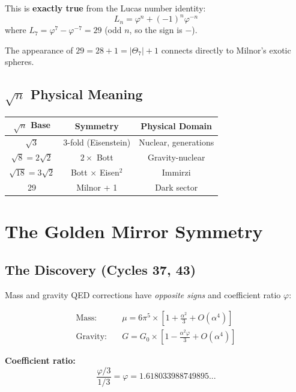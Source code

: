 \documentclass[aps,prd,twocolumn,superscriptaddress,floatfix,nofootinbib]{revtex4-2}
\theoremstyle{definition}
\theoremstyle{remark}
\newcommand{\vp}{\varphi}
\newcommand{\Th}{\Theta}
\begin{document}
This is \textbf{exactly true} from the Lucas number identity:
\begin{equation}
L_n = \vp^n + (-1)^n \vp^{-n}
\end{equation}
where $L_7 = \vp^7 - \vp^{-7} = 29$ (odd $n$, so the sign is $-$).

The appearance of $29 = 28 + 1 = |\Th_7| + 1$ connects directly to Milnor's exotic spheres.

\subsection{$\sqrt{n}$ Physical Meaning}

\begin{center}
\begin{tabular}{ccc}
\toprule
$\sqrt{n}$ Base & Symmetry & Physical Domain \\
\midrule
$\sqrt{3}$ & 3-fold (Eisenstein) & Nuclear, generations \\
$\sqrt{8} = 2\sqrt{2}$ & $2 \times$ Bott & Gravity-nuclear \\
$\sqrt{18} = 3\sqrt{2}$ & Bott $\times$ Eisen$^2$ & Immirzi \\
29 & Milnor + 1 & Dark sector \\
\bottomrule
\end{tabular}
\end{center}

\section{The Golden Mirror Symmetry}

\subsection{The Discovery (Cycles 37, 43)}

Mass and gravity QED corrections have \textit{opposite signs} and coefficient ratio $\vp$:

\begin{align}
\text{Mass:} &\quad \mu = 6\pi^5 \times \left[1 + \frac{\alpha^2}{3} + O(\alpha^4)\right] \\
\text{Gravity:} &\quad G = G_0 \times \left[1 - \frac{\alpha^2 \vp}{3} + O(\alpha^4)\right]
\end{align}

\textbf{Coefficient ratio:}
\begin{equation}
\frac{\vp/3}{1/3} = \vp = 1.618033988749895...
\end{equation}
\end{document}
